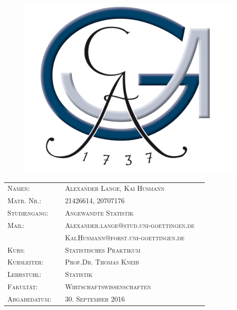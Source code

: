 \documentclass{Vorlage}
\begin{document}

\begin{titlepage}

\begin{figure}
 \begin{center}
 \includegraphics[scale=0.8]{Pictures/logo3}
 \end{center}
\end{figure}
\vspace*{3cm}





\vspace{1cm}

\begin{tabular}{p{3.5cm}|p{0.1cm} p{10cm}l}
\textsc{Namen:} & & \textsc{Alexander Lange, Kai Husmann}\\
\textsc{Matr. Nr.:} & & \textsc{21426614, 20707176}\\
\textsc{Studiengang:} & & \textsc{Angewandte Statistik}\\
\textsc{Mail:} & & \textsc{Alexander.lange$ @ $stud.uni-goettingen.de}\\
\textsc{} & & \textsc{Kai.Husmann$ @ $forst.uni-goettingen.de}\\
\textsc{Kurs:} & & \textsc{Statistisches Praktikum}\\
\textsc{Kursleiter:} & & \textsc{Prof.Dr. Thomas Kneib}\\
\textsc{Lehrstuhl:} & & \textsc{Statistik}\\
\textsc{Fakultät:} & & \textsc{Wirtschaftswissenschaften}\\
\textsc{Abgabedatum:} & & \textsc{30. September 2016}\\
\end{tabular}
\end{titlepage}
\end{document}
